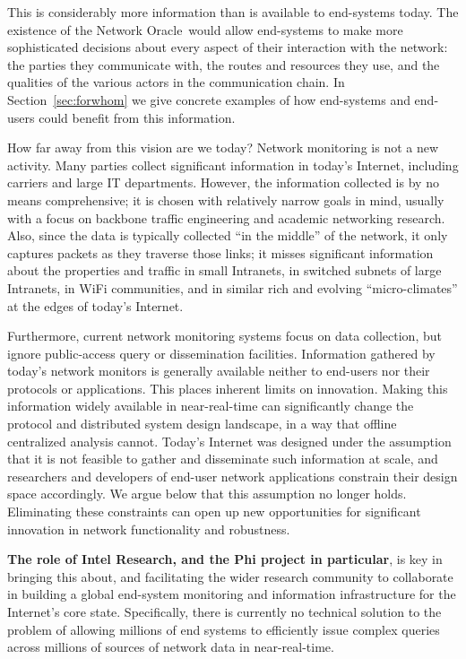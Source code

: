 \documentclass[twocolumn,10pt]{article}
\def\Sys{Network Oracle\xspace}
\def\Lrp{Phi\xspace}
\begin{document}
This is considerably more information than is available to end-systems
today.  The existence of the \Sys\ would allow end-systems to make
more sophisticated decisions about every aspect of their interaction
with the network: the parties they communicate with, the routes and
resources they use, and the qualities of the various actors in the
communication chain.  In Section~\ref{sec:forwhom} we give concrete
examples of how end-systems and end-users could benefit from this
information.


How far away from this vision are we today?  Network monitoring is not
a new activity.  Many parties collect significant information in
today's Internet, including carriers and large IT departments.
However, the 
information collected is by no means comprehensive; it is chosen with
relatively narrow goals in mind, usually with a focus on backbone
traffic engineering and academic networking research.  Also, since the
data is typically collected ``in the middle'' of the network, it only
captures packets as they traverse those links; it misses significant
information about the properties and traffic in small Intranets, in
switched subnets of large Intranets,
in WiFi communities, and in similar rich and evolving ``micro-climates'' at the
edges of today's Internet.  

Furthermore, current network monitoring systems
focus on data collection, but ignore public-access query or
dissemination facilities.  Information gathered by today's network
monitors is generally available neither to end-users nor their
protocols or applications.  This places inherent limits on
innovation.  Making this information widely available in
near-real-time can significantly change the protocol and distributed
system design landscape, in a way that offline centralized analysis
cannot.  Today's Internet was designed under the assumption that it is
not feasible to gather and disseminate such information at scale, and
researchers and developers of end-user network applications constrain
their design space accordingly.  We argue below that this
assumption no longer holds. Eliminating these constraints can open up
new opportunities for significant innovation in network functionality
and robustness.

\textbf{The role of Intel Research, and the \Lrp project in
particular}, is key in bringing this about, and facilitating the
wider research community to collaborate in building a global
end-system monitoring and information infrastructure for the
Internet's core state.  Specifically, there is currently no
technical solution to the problem of allowing millions of end systems
to efficiently issue complex queries across millions of sources of
network data in near-real-time. 
\end{document}
